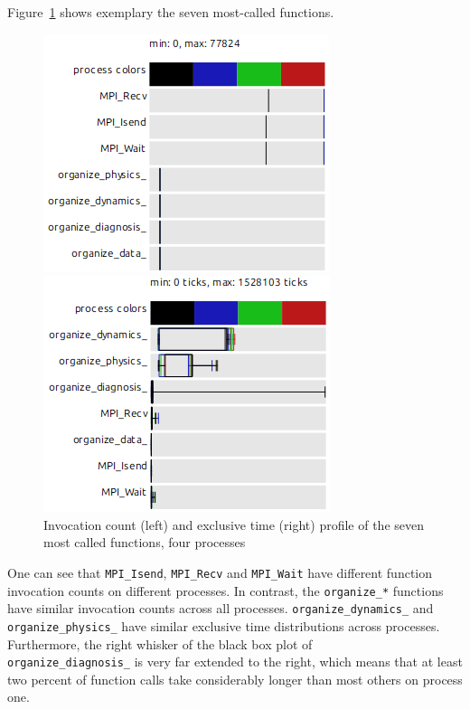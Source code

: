 \documentclass[b5paper, final, hauptseminar]{zih-template}
\begin{document}
Figure~\ref{fig:id-p-4-2} shows exemplary the seven most-called functions.
\begin{figure}[htbp]
	\centering
	\begin{minipage}{0.20\linewidth}
	\end{minipage}
	\begin{minipage}{0.39\linewidth}
		\includegraphics[width=0.9\linewidth]{id-p-4-2}
	\end{minipage}
	\begin{minipage}{0.39\linewidth}
		\includegraphics[width=0.9\linewidth]{id-p-4-3}
	\end{minipage}
	\caption{Invocation count (left) and exclusive time (right) profile of the seven most called functions, four processes}
	\label{fig:id-p-4-2}
\end{figure}
One can see that \texttt{MPI\_Isend}, \texttt{MPI\_Recv} and \texttt{MPI\_Wait} have different function invocation counts on different processes.
In contrast, the \texttt{organize\_*} functions have similar invocation counts across all processes.
\texttt{organize\_dynamics\_} and \texttt{organize\_physics\_} have similar exclusive time distributions across processes.
Furthermore, the right whisker of the black box plot of \\ \texttt{organize\_diagnosis\_} is very far extended to the right, which means that at least two percent of function calls take considerably longer than most others on process one.
\end{document}

